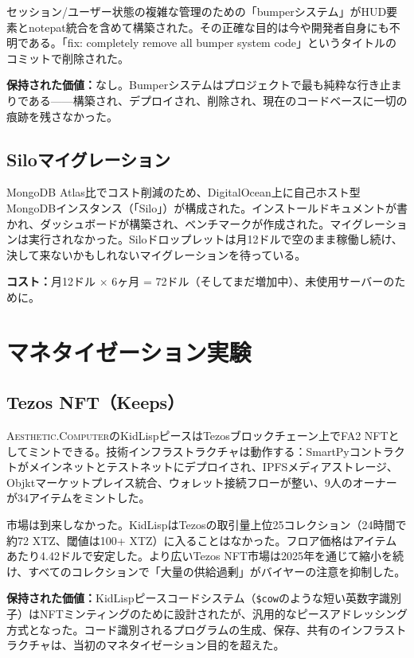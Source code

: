 \documentclass[10pt,letterpaper,twocolumn]{article}
\newcommand{\ac}{\textsc{Aesthetic.Computer}}
\begin{document}
セッション/ユーザー状態の複雑な管理のための「bumperシステム」がHUD要素とnotepat統合を含めて構築された。その正確な目的は今や開発者自身にも不明である。「fix: completely remove all bumper system code」というタイトルのコミットで削除された。

\textbf{保持された価値：}なし。Bumperシステムはプロジェクトで最も純粋な行き止まりである——構築され、デプロイされ、削除され、現在のコードベースに一切の痕跡を残さなかった。

\subsection{Siloマイグレーション}

MongoDB Atlas比でコスト削減のため、DigitalOcean上に自己ホスト型MongoDBインスタンス（「Silo」）が構成された。インストールドキュメントが書かれ、ダッシュボードが構築され、ベンチマークが作成された。マイグレーションは実行されなかった。Siloドロップレットは月12ドルで空のまま稼働し続け、決して来ないかもしれないマイグレーションを待っている。

\textbf{コスト：}月12ドル $\times$ 6ヶ月 = 72ドル（そしてまだ増加中）、未使用サーバーのために。

\section{マネタイゼーション実験}

\subsection{Tezos NFT（Keeps）}

\ac{}のKidLispピースはTezosブロックチェーン上でFA2 NFTとしてミントできる。技術インフラストラクチャは動作する：SmartPyコントラクトがメインネットとテストネットにデプロイされ、IPFSメディアストレージ、Objktマーケットプレイス統合、ウォレット接続フローが整い、9人のオーナーが34アイテムをミントした。

市場は到来しなかった。KidLispはTezosの取引量上位25コレクション（24時間で約72 XTZ、閾値は100+ XTZ）に入ることはなかった。フロア価格はアイテムあたり4.42ドルで安定した。より広いTezos NFT市場は2025年を通じて縮小を続け、すべてのコレクションで「大量の供給過剰」がバイヤーの注意を抑制した。

\textbf{保持された価値：}KidLispピースコードシステム（\texttt{\$cow}のような短い英数字識別子）はNFTミンティングのために設計されたが、汎用的なピースアドレッシング方式となった。コード識別されるプログラムの生成、保存、共有のインフラストラクチャは、当初のマネタイゼーション目的を超えた。
\end{document}
